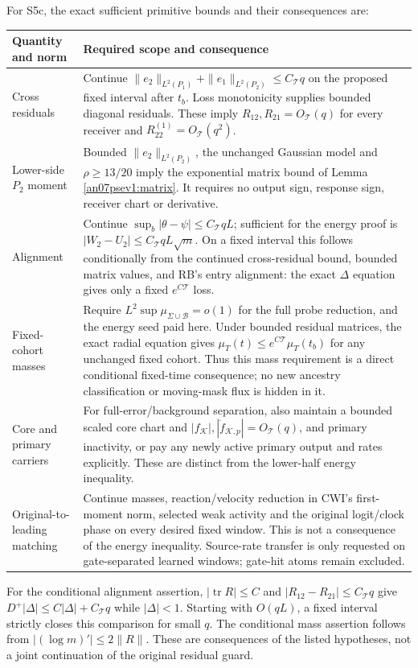 \documentclass[11pt]{article}
\numberwithin{equation}{section}
\theoremstyle{remark}\newtheorem{remark}[theorem]{Remark}
\newcommand{\KK}{\mathcal K}\newcommand{\BB}{\mathcal B}
\begin{document}
For S5c, the exact sufficient primitive bounds and their
consequences are:
\small
\begin{longtable}{>{\raggedright\arraybackslash}p{}
 >{\raggedright\arraybackslash}p{}}
\toprule Quantity and norm & Required scope and consequence\\\midrule\endhead
Cross residuals
& Continue \(\|e_2\|_{L^2(P_1)}+\|e_1\|_{L^2(P_2)}
 \le C_{\mathcal T}q\) on the proposed fixed interval after \(t_b\).
 Loss monotonicity supplies bounded diagonal residuals.
 These imply \(R_{12},R_{21}=O_{\mathcal T}(q)\) for every receiver
 and \(R_{22}^{(1)}=O_{\mathcal T}(q^2)\).\\
Lower-side \(P_2\) moment
& Bounded \(\|e_2\|_{L^2(P_2)}\), the unchanged Gaussian
 model and \(\rho\ge13/20\) imply the exponential matrix
 bound of Lemma \ref{an07psev1:matrix}. It requires no
 output sign, response sign, receiver chart or derivative.\\
Alignment
& Continue \(\sup_b|\theta-\psi|\le C_{\mathcal T}qL\);
 sufficient for the energy proof is
 \(|W_2-U_2|\le C_{\mathcal T}qL\sqrt m\).
 On a fixed interval this follows conditionally from the
 continued cross-residual bound, bounded matrix values,
 and RB's entry alignment: the exact \(\Delta\) equation
 gives only a fixed \(e^{C\mathcal T}\) loss.\\
Fixed-cohort masses
& Require \(L^2\sup\mu_{\Sigma\cup\BB}=o(1)\) for the
 full probe reduction, and the energy seed paid here.
 Under bounded residual matrices, the exact radial equation
 gives \(\mu_T(t)\le e^{C\mathcal T}\mu_T(t_b)\) for any unchanged
 fixed cohort. Thus this mass requirement is a direct
 conditional fixed-time consequence; no new ancestry
 classification or moving-mask flux is hidden in it.\\
Core and primary carriers
& For full-error/background separation, also maintain a
 bounded scaled core chart and
 \(|f_\KK|,|\dot f_{\KK,p}|=O_{\mathcal T}(q)\),
 and primary inactivity, or pay any newly active primary
 output and rates explicitly. These are distinct from the
 lower-half energy inequality.\\
Original-to-leading matching
& Continue masses, reaction/velocity reduction in CWI's
 first-moment norm, selected weak activity and the original
 logit/clock phase on every desired fixed window. This is
 not a consequence of the energy inequality. Source-rate
 transfer is only requested on gate-separated learned
 windows; gate-hit atoms remain excluded.\\\bottomrule
\end{longtable}\normalsize
For the conditional alignment assertion, \(|\operatorname{tr}R|\le C\)
and \(|R_{12}-R_{21}|\le C_{\mathcal T}q\) give
\(D^+|\Delta|\le C|\Delta|+C_{\mathcal T}q\) while \(|\Delta|<1\).
Starting with \(O(qL)\), a fixed interval strictly closes
this comparison for small \(q\). The conditional mass
assertion follows from \(|(\log m)'|\le2\|R\|\).
These are consequences of the listed hypotheses, not a
joint continuation of the original residual guard.
\end{document}
